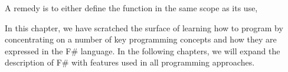 

A remedy is to either define the function in the same scope as its use,
%


In this chapter, we have scratched the surface of learning how to program by concentrating on a number of key programming concepts and how they are expressed in the F\# language. In the following chapters, we will expand the description of F\# with features used in all programming approaches.

